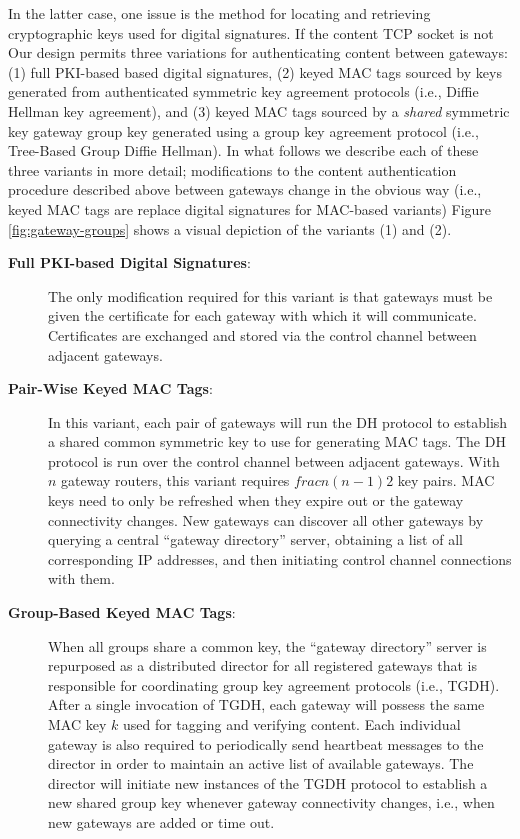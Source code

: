 In the latter case, one issue is the method for locating and retrieving cryptographic keys used for digital signatures. If the content TCP socket is not Our design permits three variations for authenticating content between gateways: (1) full PKI-based based digital signatures, (2) keyed MAC tags sourced by keys generated from authenticated symmetric key agreement protocols (i.e., Diffie Hellman key agreement), and (3) keyed MAC tags sourced by a \emph{shared} symmetric key gateway group key generated using a group key agreement protocol (i.e., Tree-Based Group Diffie Hellman). In what follows we describe each of these three variants in more detail; modifications to the content authentication procedure described above between gateways change in the obvious way (i.e., keyed MAC tags are replace digital signatures for MAC-based variants) Figure \ref{fig:gateway-groups} shows a visual depiction of the variants (1) and (2). \\

\begin{description}

	\item[\textbf{Full PKI-based Digital Signatures}:] The only modification required for this variant is that gateways must be given the certificate for each gateway with which it will communicate. Certificates are exchanged and stored via the control channel between adjacent gateways.

	\item[\textbf{Pair-Wise Keyed MAC Tags}:] In this variant, each pair of gateways will run the DH protocol to establish a shared common symmetric key to use for generating MAC tags. The DH protocol is run over the control channel between adjacent gateways. With $n$ gateway routers, this variant requires $frac{n(n-1)}{2}$ key pairs. MAC keys need to only be refreshed when they expire out or the gateway connectivity changes. New gateways can discover all other gateways by querying a central ``gateway directory'' server, obtaining a list of all corresponding IP addresses, and then initiating control channel connections with them.

	\item[\textbf{Group-Based Keyed MAC Tags}:] When all groups share a common key, the ``gateway directory'' server is repurposed as a distributed director for all registered gateways that is responsible for coordinating group key agreement protocols (i.e., TGDH). After a single invocation of TGDH, each gateway will possess the same MAC key $k$ used for tagging and verifying content. Each individual gateway is also required to periodically send heartbeat messages to the director in order to maintain an active list of available gateways. The director will initiate new instances of the TGDH protocol to establish a new shared group key whenever gateway connectivity changes, i.e., when new gateways are added or time out. 

\end{description}

